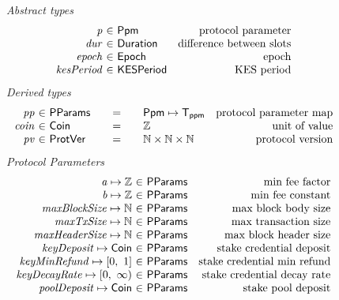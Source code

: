 \begin{figure*}[htb]
  \emph{Abstract types}
  \begin{equation*}
    \begin{array}{r@{~\in~}lr}
      \var{p} & \Ppm & \text{protocol parameter}\\
      \var{dur} & \Duration & \text{difference between slots}\\
      \var{epoch} & \Epoch & \text{epoch} \\
      \var{kesPeriod} & \KESPeriod & \text{KES period} \\
    \end{array}
  \end{equation*}
  \emph{Derived types}
  \begin{equation*}
    \begin{array}{r@{~\in~}l@{\qquad=\qquad}lr}
      \var{pp}
      & \PParams
      & \Ppm \mapsto \mathsf{T_{ppm}}
      & \text{protocol parameter map}
      \\
      \var{coin}
      & \Coin
      & \Z
      & \text{unit of value}
      \\
      \var{pv}
      & \ProtVer
      & \N\times\N\times\N
      & \text{protocol version}
    \end{array}
  \end{equation*}
  \emph{Protocol Parameters}
  \begin{equation*}
      \begin{array}{r@{~\in~}lr}
        \var{a} \mapsto \Z & \PParams & \text{min fee factor}\\
        \var{b} \mapsto \Z & \PParams & \text{min fee constant}\\
        \var{maxBlockSize} \mapsto \N & \PParams & \text{max block body size}\\
        \var{maxTxSize} \mapsto \N & \PParams & \text{max transaction size}\\
        \var{maxHeaderSize} \mapsto \N & \PParams & \text{max block header size}\\
        \var{keyDeposit} \mapsto \Coin & \PParams & \text{stake credential deposit}\\
        \var{keyMinRefund} \mapsto \unitInterval & \PParams & \text{stake credential min refund}\\
        \var{keyDecayRate} \mapsto \nonnegReals & \PParams & \text{stake credential decay rate}\\
        \var{poolDeposit} \mapsto \Coin & \PParams & \text{stake pool deposit}\\

\end{array}
\end{equation*}
\end{figure*}
